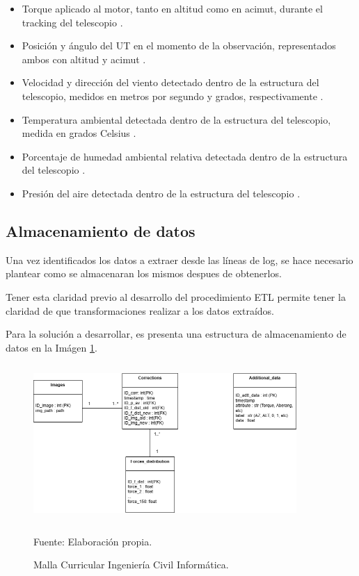 \begin{itemize}
    \item Torque aplicado al motor, tanto en altitud como en acimut, durante el tracking del telescopio \cite{eso1998vlt}.

    \item Posición y ángulo del UT en el momento de la observación, representados ambos con altitud y acimut \cite{eso1998vlt}.

    \item Velocidad y dirección del viento detectado dentro de la estructura del telescopio, medidos en metros por segundo y grados, respectivamente \cite{eso1998vlt}.

    \item Temperatura ambiental detectada dentro de la estructura del telescopio, medida en grados Celsius \cite{eso1998vlt}.

    \item Porcentaje de humedad ambiental relativa detectada dentro de la estructura del telescopio \cite{eso1998vlt}.

    \item Presión del aire detectada dentro de la estructura del telescopio \cite{eso1998vlt}.    
\end{itemize}

\subsection{Almacenamiento de datos}

Una vez identificados los datos a extraer desde las líneas de log, se hace necesario plantear como se almacenaran los mismos despues de obtenerlos. 

Tener esta claridad previo al desarrollo del procedimiento ETL permite tener la claridad de que transformaciones realizar a los datos extraídos.

Para la solución a desarrollar, es presenta una estructura de almacenamiento de datos en la Imágen \ref{fig:db_general}.

\begin{figure}[h]
\centering
\includegraphics[width=10cm,height=6cm]{figures/db_diagram.png}
\caption{\label{fig:db_general} Malla Curricular Ingeniería Civil Informática.} Fuente: Elaboración propia.
\end{figure}

